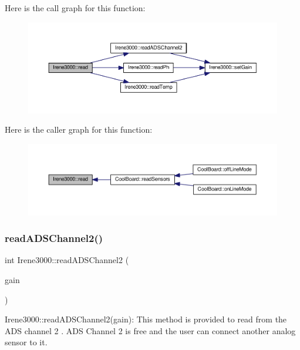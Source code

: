 Here is the call graph for this function\+:\nopagebreak
\begin{figure}[H]
\begin{center}
\leavevmode
\includegraphics[width=350pt]{classIrene3000_a852a170feea994ea1df01c6b245b5d9a_cgraph}
\end{center}
\end{figure}
Here is the caller graph for this function\+:\nopagebreak
\begin{figure}[H]
\begin{center}
\leavevmode
\includegraphics[width=350pt]{classIrene3000_a852a170feea994ea1df01c6b245b5d9a_icgraph}
\end{center}
\end{figure}
\mbox{\label{classIrene3000_ae73bd2ed14a199a7e83f4d6458476a7c}} 
\subsubsection{\texorpdfstring{read\+A\+D\+S\+Channel2()}{readADSChannel2()}}
{\footnotesize\ttfamily int Irene3000\+::read\+A\+D\+S\+Channel2 (\begin{DoxyParamCaption}\item[{ads\+Gain\+\_\+t}]{gain }\end{DoxyParamCaption})}

Irene3000\+::read\+A\+D\+S\+Channel2(gain)\+: This method is provided to read from the A\+DS channel 2 . A\+DS Channel 2 is free and the user can connect another analog sensor to it.

